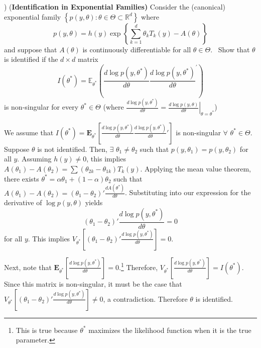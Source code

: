 \documentclass[12pt,english]{article}
\begin{document}
\vspace{1em}
) (\textbf{Identification in Exponential Families) }Consider the
(canonical) exponential family $\left\{ p\left( y,\theta \right) :\theta \in
\Theta\subset\mathbb{R}^{d} \right\} $ where%
\begin{equation*}
p\left( y,\theta \right) =h\left( y\right) \exp \left\{ \sum_{k=1}^{d}\theta
_{k}T_{k}\left( y\right) -A\left( \theta \right) \right\}
\end{equation*}%
and suppose that $A\left( \theta \right) $ is continuously
differentiable for all 
$\theta \in \Theta $. \ Show that $\theta $ is identified if the $d\times d$
matrix%
\begin{equation*}
I\left( \theta ^{\ast }\right) =\mathbb{E}_{\theta^{*}}\left( \frac{d\log p\left(
	y,\theta ^{\ast }\right) }{d\theta }\frac{d\log p\left( y,\theta ^{\ast
	}\right) }{d\theta }^{\prime }\right)
\end{equation*}
is non-singular for every $\theta ^{\ast }\in \Theta $ (where $\frac{d\log
	p\left( y,\theta ^{\ast }\right) }{d\theta }=\left. \frac{d\log p\left(
	y,\theta \right) }{d\theta }\right\vert _{\theta =\theta ^{\ast }}$)
\vspace{1em}

We assume that $I(\theta^{*}) = \mathbf{E}_{\theta^{*}} \left[ \frac{d \log p(y, \theta^{*})}{d\theta} \frac{d \log p(y, \theta^{*})}{d\theta}' \right]$ is non-singular $\forall$ $\theta^{*} \in \Theta$. Suppose $\theta$ is not identified. Then, $\exists$ $\theta_{1} \neq \theta_{2}$ such that $p(y, \theta_{1}) = p(y, \theta_{2})$ for all $y$. Assuming $h(y) \neq 0$, this implies $A(\theta_{1}) - A(\theta_{2}) = \sum(\theta_{2k} - \theta_{1k}) T_{k}(y)$. Applying the mean value theorem, there exists $\theta^{*} = \alpha \theta_{1} + (1 - \alpha) \theta_{2}$ such that $ A(\theta_{1}) - A(\theta_{2}) = (\theta_{1} - \theta_{2})' \frac{d A(\theta^{*})}{d\theta}$. Substituting into our expression for the derivative of $\log p(y, \theta)$ yields
$$ (\theta_{1} - \theta_{2})' \frac{d \log p(y, \theta^{*})}{d\theta} = 0 $$
for all $y$. This implies $V_{\theta^{*}}\left[(\theta_{1} - \theta_{2})' \frac{d \log p(y, \theta^{*})}{d\theta}\right] = 0$.

Next, note that $\mathbf{E}_{\theta^{*}} \left[ \frac{d \log p(y, \theta^{*})}{d \theta} \right] = 0$.\footnote{This is true because $\theta^{*}$ maximizes the likelihood function when it is the true parameter.} Therefore, $V_{\theta^{*}}\left[ \frac{d \log p(y, \theta^{*})}{d \theta} \right] = I(\theta^{*})$. Since this matrix is non-singular, it must be the case that $V_{\theta^{*}}\left[(\theta_{1} - \theta_{2})' \frac{d \log p(y, \theta^{*})}{d\theta}\right] \neq 0$, a contradiction. Therefore $\theta$ is identified.
\end{document}
